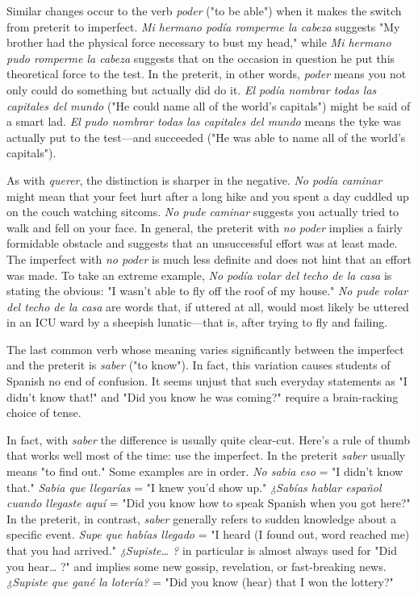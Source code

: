 \documentclass[14pt,a4paper,oneside]{memoir}
\begin{document}
Similar changes occur to the verb \emph{poder} ("to be able") when it
makes the switch from preterit to imperfect. \emph{Mi hermano podía romperme la cabeza} suggests "My brother had the physical force necessary
to bust my head," while \emph{Mi hermano pudo romperme la cabeza} suggests that on the occasion in question he put this theoretical force to
the test. In the preterit, in other words, \emph{poder} means you not only
could do something but actually did do it. \emph{El podía nombrar todas las
	capitales del mundo} ("He could name all of the world's capitals")
might be said of a smart lad. \emph{El pudo nombrar todas las capitales del
	mundo} means the tyke was actually put to the test---and succeeded
("He was able to name all of the world's capitals").

As with \emph{querer}, the distinction is sharper in the negative. \emph{No
	podía caminar} might mean that your feet hurt after a long hike and
you spent a day cuddled up on the couch watching sitcoms. \emph{No pude
	caminar} suggests you actually tried to walk and fell on your face. In
general, the preterit with \emph{no poder} implies a fairly formidable obstacle
and suggests that an unsuccessful effort was at least made. The imperfect with \emph{no poder} is much less definite and does not hint that an effort was made. To take an extreme example, \emph{No podía volar del techo
	de la casa} is stating the obvious: "I wasn't able to fly off the roof of my
house." \emph{No pude volar del techo de la casa} are words that, if uttered
at all, would most likely be uttered in an ICU ward by a sheepish lunatic---that is, after trying to fly and failing.

The last common verb whose meaning varies significantly
between the imperfect and the preterit is \emph{saber} ("to know"). In fact, this
variation causes students of Spanish no end of confusion. It seems unjust that such everyday statements as "I didn't know that!" and "Did
you know he was coming?" require a brain-racking choice of tense.

In fact, with \emph{saber} the difference is usually quite clear-cut.
Here's a rule of thumb that works well most of the time: use the imperfect. In the preterit \emph{saber} usually means "to find out." Some examples are in order. \emph{No sabia eso} = "I didn't know that." \emph{Sabia que
	llegarías} = "I knew you'd show up." \emph{¿Sabías hablar español cuando
	llegaste aquí} = "Did you know how to speak Spanish when you got
here?" In the preterit, in contrast, \emph{saber} generally refers to sudden
knowledge about a specific event. \emph{Supe que habías llegado} = "I heard
(I found out, word reached me) that you had arrived." \emph{¿Supiste\ldots{} ?} in
particular is almost always used for "Did you hear\ldots{} ?" and implies
some new gossip, revelation, or fast-breaking news. \emph{¿Supiste que gané
	la lotería?} = "Did you know (hear) that I won the lottery?"
\end{document}
